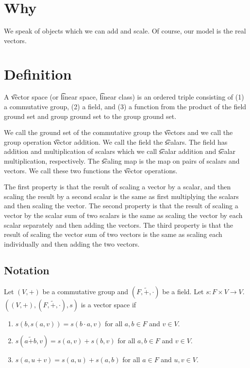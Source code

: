 

\section*{Why}

We speak of objects which we can add and scale.
Of course, our model is the real vectors.

\section*{Definition}

A \t{vector space} (or \t{linear space}, \t{linear class}) is an ordered triple consisting of (1) a commutative group, (2) a field, and (3) a function from the product of the field ground set and group ground set to the group ground set.

We call the ground set of the commutative group the \t{vectors} and we call the group operation \t{vector addition}.
We call the field the \t{scalars}.
The field has addition and multiplication of scalars which we call \t{scalar addition} and \t{scalar multiplication}, respectively.
The \t{scaling map} is the map on pairs of scalars and vectors.
We call these two functions the \t{vector operations}.

The first property is that the result of scaling a vector by a scalar, and then scaling the result by a second scalar is the same as first multiplying the scalars and then scaling the vector.
The second property is that the result of scaling a vector by the scalar sum of two scalars is the same as scaling the vector by each scalar separately and then adding the vectors.
The third property is that the result of scaling the vector sum of two vectors is the same as scaling each individually and then adding the two vectors.

\subsection*{Notation}

Let $(V,+)$ be a commutative group and $(F, \tilde{+}, \cdot)$ be a field.
Let $s: F \times  V \to V$. $((V, +), (F, \tilde{+}, \cdot), s)$ is a vector space if
  \begin{enumerate}
    \item $s(b,s(a, v)) = s(b \cdot a, v)$ for all $a, b \in F$ and $v \in V$.
    \item $s(a\tilde{+}b, v) = s(a, v) + s(b, v)$ for all $a, b \in F$ and $v \in V$.
    \item $s(a, u + v) = s(a,u) + s(a, b)$ for all $a \in F$ and $u, v \in V$.
  \end{enumerate}

